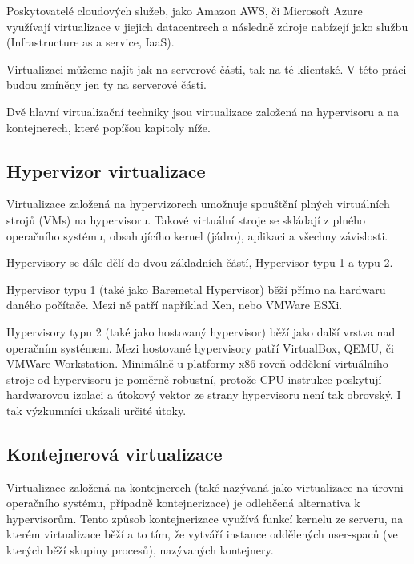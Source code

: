 \documentclass[thesis=M,czech]{FITthesis}[2019/12/23]
\theoremstyle{plain}
\theoremstyle{definition}
\begin{document}
Poskytovatelé cloudových služeb, jako Amazon AWS, či Microsoft Azure využívají virtualizace v jiejich datacentrech a následně zdroje nabízejí jako službu (Infrastructure as a service, IaaS). 


Virtualizaci můžeme najít jak na serverové části, tak na té klientské. V této práci budou zmíněny jen ty na serverové části.

Dvě hlavní virtualizační techniky jsou virtualizace založená na hypervisoru a na kontejnerech, které popíšou kapitoly níže.

\subsection{Hypervizor virtualizace}

Virtualizace založená na hypervizorech umožnuje spouštění plných virtuálních strojů (VMs) na hypervisoru. Takové virtuální stroje se skládají z plného operačního systému, obsahujícího kernel (jádro), aplikaci a všechny závislosti. \cite{virt-comparison}


Hypervisory se dále dělí do dvou základních částí, Hypervisor typu 1 a typu 2.

Hypervisor typu 1 (také jako Baremetal Hypervisor) běží přímo na hardwaru daného počítače. Mezi ně patří například Xen, nebo  VMWare ESXi. 

Hypervisory typu 2 (také jako hostovaný hypervisor) běží jako další vrstva nad operačním systémem. Mezi hostované hypervisory patří VirtualBox, QEMU, či VMWare Workstation. Minimálně u platformy x86 roveň oddělení virtuálního stroje od hypervisoru je poměrně robustní, protože CPU instrukce poskytují hardwarovou izolaci a útokový vektor ze strany hypervisoru není tak obrovský. I tak výzkumníci ukázali určité útoky.  



\subsection{Kontejnerová virtualizace}


Virtualizace založená na kontejnerech (také nazývaná jako virtualizace na úrovni operačního systému, případně kontejnerizace) je odlehčená alternativa k hypervisorům. Tento způsob kontejnerizace využívá funkcí kernelu ze serveru, na kterém virtualizace běží a to tím, že vytváří instance oddělených user-spaců (ve kterých běží skupiny procesů), nazývaných kontejnery. 
\end{document}
